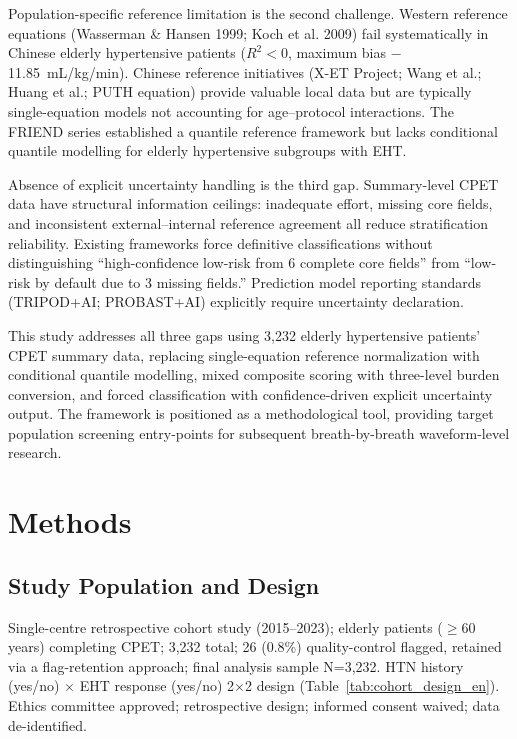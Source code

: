 \documentclass[12pt, a4paper]{article}
\begin{document}
Population-specific reference limitation is the second challenge.
Western reference equations (Wasserman \& Hansen 1999\cite{Wasserman1999};
Koch et al. 2009\cite{Koch2009}) fail systematically in Chinese elderly
hypertensive patients ($R^2 < 0$, maximum bias $-$11.85~mL/kg/min).
Chinese reference initiatives (X-ET Project\cite{XET2021};
Wang et al.\cite{WangCycle2022}; Huang et al.\cite{HuangTreadmill2024};
PUTH equation\cite{PUTHCycle2025}) provide valuable local data but are
typically single-equation models not accounting for age--protocol interactions.
The FRIEND series\cite{FRIEND2016cycle,FRIEND2022} established a quantile
reference framework but lacks conditional quantile modelling for elderly
hypertensive subgroups with EHT.

Absence of explicit uncertainty handling is the third gap.
Summary-level CPET data have structural information ceilings: inadequate effort,
missing core fields, and inconsistent external--internal reference agreement all
reduce stratification reliability. Existing frameworks force definitive
classifications without distinguishing ``high-confidence low-risk from 6
complete core fields'' from ``low-risk by default due to 3 missing fields.''
Prediction model reporting standards (TRIPOD+AI\cite{TRIPODAI2024};
PROBAST+AI\cite{PROBASTAI2025}) explicitly require uncertainty declaration.

This study addresses all three gaps using 3,232 elderly hypertensive patients'
CPET summary data, replacing single-equation reference normalization with
conditional quantile modelling, mixed composite scoring with three-level burden
conversion, and forced classification with confidence-driven explicit uncertainty
output. The framework is positioned as a methodological tool,
providing target population screening entry-points for subsequent breath-by-breath
waveform-level research.

\section{Methods}

\subsection{Study Population and Design}

Single-centre retrospective cohort study (2015--2023); elderly patients
($\geq$60 years) completing CPET; 3,232 total; 26 (0.8\%) quality-control
flagged, retained via a flag-retention approach; final analysis sample N=3,232.
HTN history (yes/no) $\times$ EHT response (yes/no) 2$\times$2 design
(Table~\ref{tab:cohort_design_en}). Ethics committee approved; retrospective
design; informed consent waived; data de-identified.
\end{document}
